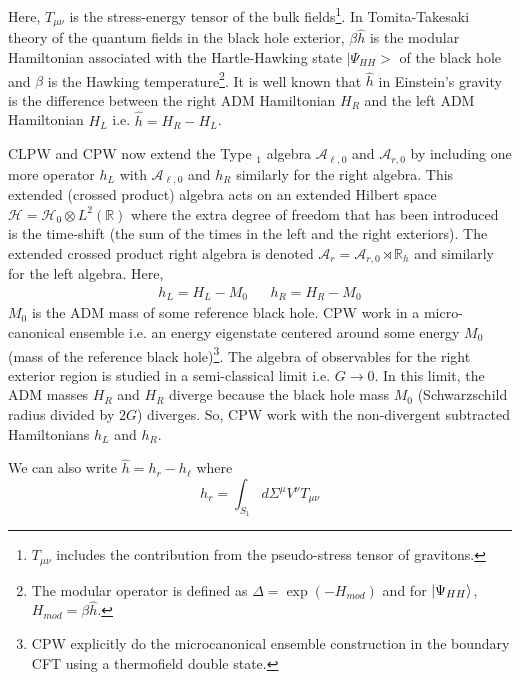 \documentclass[12pt]{article}
\DeclarePairedDelimiter\ket{\lvert}{\rangle}
\newcommand{\RomanNumeralCaps}[1]
    {\MakeUppercase{\romannumeral #1}}
\begin{document}
  Here, $T_{\mu \nu}$ is the stress-energy tensor of the bulk fields\footnote{$T_{\mu \nu }$ includes the contribution from the pseudo-stress tensor of gravitons.}. In Tomita-Takesaki theory of the quantum fields in the black hole exterior, $\beta \hat{h}$ is the modular Hamiltonian associated with the Hartle-Hawking state $|\Psi_{HH}>$ of the black hole and $\beta$ is the Hawking temperature\footnote{The modular operator is defined as $\Delta=\exp{(-H_{mod})}$ and for $\ket{\Psi_{HH}}$, $H_{mod}=\beta \hat{h}$.}\cite{JE, GS}. It is well known that $\hat{h}$ in Einstein's gravity is the difference between the right ADM Hamiltonian $H_{R}$ and the left ADM Hamiltonian $H_{L}$ i.e. $\hat{h}= H_{R}- H_{L}$.

  CLPW and CPW now extend the Type \RomanNumeralCaps {3}$_1$ algebra $\mathcal{A}_{\ell,0}$ and $\mathcal{A}_{r,0}$ by including one more operator $h_L$ with $\mathcal{A}_{\ell,0}$ and $h_R$ similarly for the right algebra. This extended (crossed product) algebra acts on an extended Hilbert space $\mathcal{H}= \mathcal{H}_{0}\otimes L^2(\mathbb{R})$ where the extra degree of freedom that has been introduced is the time-shift (the sum of the times in the left and the right exteriors). The extended crossed product right algebra is denoted $\mathcal{A}_{r}= \mathcal{A}_{r,0} \rtimes \mathbb{R}_{h}$ and similarly for the left algebra. Here,
  \begin{eqnarray}\label{II2}
 h_L= H_L - M_0  && h_R= H_R - M_0
 \end{eqnarray}
 $M_0$ is the ADM mass of some reference black hole.
 CPW work in a micro-canonical ensemble i.e. an energy eigenstate centered around some energy $M_0$ (mass of the reference black hole)\footnote{CPW explicitly do the microcanonical ensemble construction in the boundary CFT using a thermofield double state.}. The algebra of observables for the right exterior region is studied in a semi-classical limit i.e. $G\rightarrow 0$. In this limit, the ADM masses $H_R$ and $H_R$ diverge because the black hole mass $M_0$ (Schwarzschild radius divided by $2G$) diverges. So, CPW work with the non-divergent subtracted Hamiltonians $h_L$ and $h_R$.


 We can also write $\hat{h}=h_r - h_{\ell}$ where
 \begin{equation}\label{II3}
 h_r=\int_{S_1}d\Sigma^{\mu}V^{\nu} T_{\mu \nu}
 \end{equation}
\end{document}
